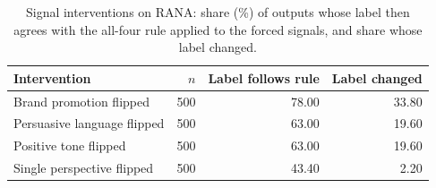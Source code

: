 \begin{table}[t]
\small
\centering
\caption{Signal interventions on RANA: share (\%) of outputs whose label then agrees with the all-four rule applied to the forced signals, and share whose label changed.}\label{tbl_faithfulness}
\begin{tabular*}{\tblwidth}{@{\extracolsep{\fill}}LRRR@{}}
\toprule
\textbf{Intervention} & \textbf{$n$} & \textbf{Label follows rule} & \textbf{Label changed} \\
\midrule
Brand promotion flipped & 500 & 78.00 & 33.80 \\
Persuasive language flipped & 500 & 63.00 & 19.60 \\
Positive tone flipped & 500 & 63.00 & 19.60 \\
Single perspective flipped & 500 & 43.40 & 2.20 \\
\bottomrule
\end{tabular*}
\end{table}
